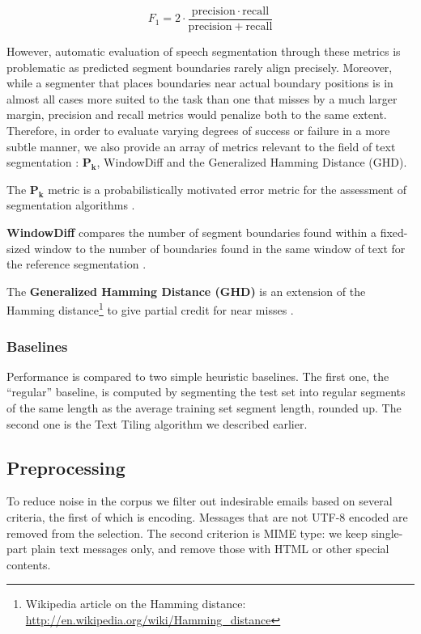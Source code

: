 \[
    F_1 = 2 \cdot \frac{\mathrm{precision} \cdot \mathrm{recall}}{\mathrm{precision} + \mathrm{recall}}
\]

However, automatic evaluation of speech segmentation through these metrics is problematic as predicted segment boundaries rarely align precisely. Moreover, while a segmenter that places boundaries near actual boundary positions is in almost all cases more suited to the task than one that misses by a much larger margin, precision and recall metrics would penalize both to the same extent. Therefore, in order to evaluate varying degrees of success or failure in a more subtle manner, we also provide an array of metrics relevant to the field of text segmentation : $\bm{P_{k}}$, WindowDiff and the Generalized Hamming Distance (GHD).

The $\bm{P_{k}}$ metric is a probabilistically motivated error metric for the assessment of segmentation algorithms \cite{beeferman1999statistical}.

\textbf{WindowDiff} compares the number of segment boundaries found within a fixed-sized window to the number of boundaries found in the same window of text for the reference segmentation \cite{pevzner2002critique}.

The \textbf{Generalized Hamming Distance (GHD)} is an extension of the Hamming distance\footnote{Wikipedia article on the Hamming distance: \url{http://en.wikipedia.org/wiki/Hamming_distance}} to give partial credit for near misses \cite{bookstein2002generalized}.

\subsubsection{Baselines}

Performance is compared to two simple heuristic baselines. The first one, the ``regular'' baseline, is computed by segmenting the test set into regular segments of the same length as the average training set segment length, rounded up. The second one is the Text Tiling algorithm we described earlier.

\subsection{Preprocessing}

To reduce noise in the corpus we filter out indesirable emails based on several criteria, the first of which is encoding. Messages that are not UTF-8 encoded are removed from the selection. The second criterion is MIME type: we keep single-part plain text messages only, and remove those with HTML or other special contents.

